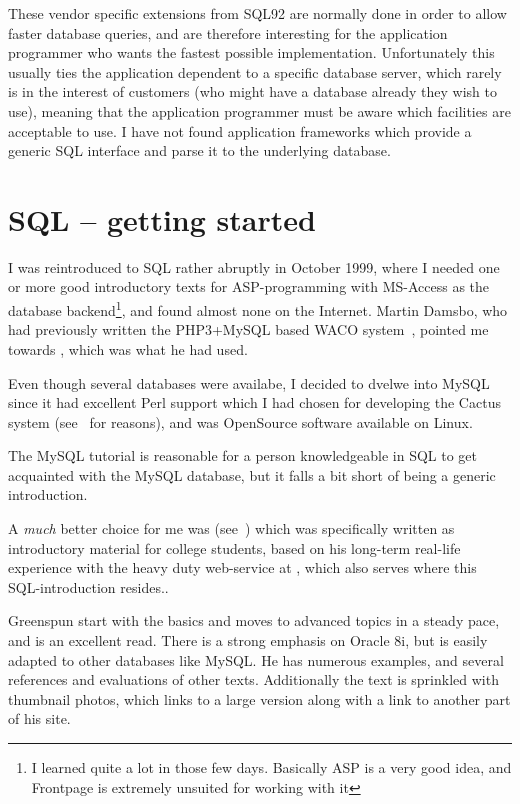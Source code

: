 These vendor specific extensions from SQL92 are normally done in order
to allow faster database queries, and are therefore interesting for
the application programmer who wants the fastest possible
implementation.  Unfortunately this usually ties the application
dependent to a specific database server, which rarely is in the
interest of customers (who might have a database already they wish to
use), meaning that the application programmer must be aware which
facilities are acceptable to use.  I have not found application
frameworks which provide a generic SQL interface and parse it to the
underlying database.


\section{SQL -- getting started}
\label{sec:sql-getting-started}

I was reintroduced to SQL rather abruptly in October 1999, where I
needed one or more good introductory texts for ASP-programming with
MS-Access as the database backend\footnote{I learned quite a lot in
  those few days.  Basically ASP is a very good idea, and Frontpage is
  extremely unsuited for working with it}, and found almost none on
the Internet.  Martin Damsbo, who had previously written the
PHP3+MySQL based WACO system~\cite{mez-waco}, pointed me towards
, which was what he had used.

Even though several databases were availabe, I decided to dvelwe into
MySQL since it had excellent Perl support which I had chosen for
developing the Cactus system (see~
for reasons), and was OpenSource software available on Linux.

The MySQL tutorial is reasonable for a person knowledgeable in SQL to
get acquainted with the MySQL database, but it falls a bit short of
being a generic introduction.


A \textit{much} better choice for me was
(see~\cite{greenspun:sql-for-web-nerds}) which was specifically written as
introductory material for college students, based on his long-term
real-life experience with the heavy duty web-service at
, which also serves
 where this SQL-introduction
resides..

Greenspun start with the basics and moves to advanced
topics in a steady pace, and is an excellent read.  There is a strong
emphasis on Oracle 8i, but is easily adapted to other databases like
MySQL.  He has numerous examples, and several references and
evaluations of other texts.  Additionally the text is sprinkled with
thumbnail photos, which links to a large version along with a link to
another part of his site.

